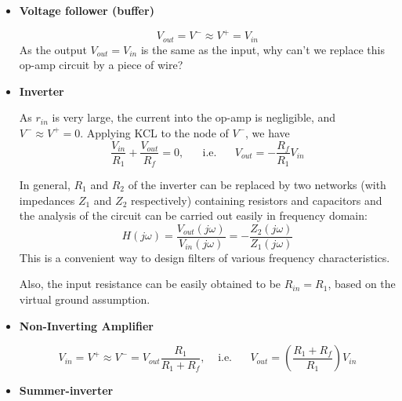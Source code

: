 \documentclass{article}
\begin{document}
\begin{itemize}
\item {\bf Voltage follower (buffer)}


  \begin{equation}
    V_{out}=V^-\approx V^+=V_{in} 
  \end{equation}
  As the output $V_{out}=V_{in}$ is the same as the input, why can't we replace this
  op-amp circuit by a piece of wire?

\item {\bf Inverter}


  As $r_{in}$ is very large, the current into the op-amp is negligible, and
  $V^-\approx V^+=0$. Applying KCL to the node of $V^-$, we have
  \begin{equation} 
    \frac{V_{in}}{R_1}+\frac{V_{out}}{R_f}=0,\;\;\;\;\;\;\mbox{i.e.}\;\;\;\;\;\;
    V_{out}=-\frac{R_f}{R_1}V_{in}	
  \end{equation}

  In general, $R_1$ and $R_2$ of the inverter can be replaced by two networks (with
  impedances $Z_1$ and $Z_2$ respectively) containing resistors and capacitors and
  the analysis of the circuit can be carried out easily in frequency domain:
  \begin{equation}
    H(j\omega)=\frac{V_{out}(j\omega)}{V_{in}(j\omega)}=-\frac{Z_2(j\omega)}{Z_1(j\omega)}
  \end{equation}
  This is a convenient way to design filters of various frequency characteristics.

  Also, the input resistance can be easily obtained to be $R_{in}=R_1$, based on 
  the virtual ground assumption.



\item {\bf Non-Inverting Amplifier}


  \begin{equation}
  V_{in}=V^+\approx V^-=V_{out}\frac{R_1}{R_1+R_f},\;\;\;\;\mbox{i.e.}
  \;\;\;\;\;\;
  V_{out}=\left(\frac{R_1+R_f}{R_1}\right)V_{in}
  \end{equation}

\item {\bf Summer-inverter}



\end{itemize}
\end{document}
